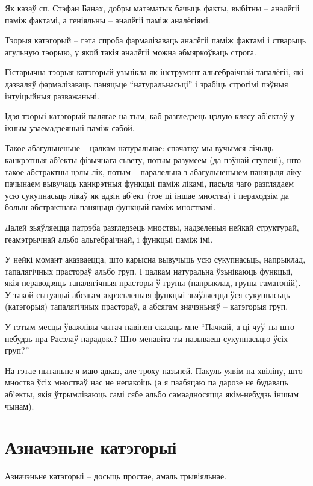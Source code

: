 \documentclass[a4paper,12pt]{book}
\begin{document}
Як казаў сп. Стэфан Банах, добры матэматык бачыць факты, выбітны --
аналёгіі паміж фактамі, а геніяльны -- аналёгіі паміж аналёгіямі.

Тэорыя катэгорый -- гэта спроба фармалізаваць аналёгіі паміж фактамі і
стварыць агульную тэорыю, у якой такія аналёгіі можна абмяркоўваць
строга.

Гістарычна тэорыя катэгорый узьнікла як інструмэнт альгебраічнай
тапалёгіі, які дазваляў фармалізаваць паняцьце ``натуральнасьці'' і
зрабіць строгімі пэўныя інтуіцыйныя разважаньні.

Ідэя тэорыі катэгорый палягае на тым, каб разгледзець цэлую клясу
аб'ектаў у іхным узаемадзеяньні паміж сабой.

Такое абагульненьне -- цалкам натуральнае: спачатку мы вучымся лічыць
канкрэтныя аб'екты фізычнага сьвету, потым разумеем (да пэўнай ступені), што такое
абстрактны цэлы лік, потым -- паралельна з абагульненьнем паняцьця
ліку -- пачынаем вывучаць канкрэтныя функцыі паміж лікамі, пасьля чаго
разглядаем усю сукупнасьць лікаў як адзін аб'ект (тое ці іншае
мноства) і пераходзім да больш абстрактнага паняцьця функцый паміж
мноствамі.

Далей зьяўляецца патрэба разгледзець мноствы, надзеленыя нейкай
структурай, геамэтрычнай альбо альгебраічнай, і функцыі паміж імі.

У нейкі момант аказваецца, што карысна вывучыць усю сукупнасьць,
напрыклад, тапалягічных прастораў альбо груп. І цалкам натуральна
ўзьнікаюць функцыі, якія пераводзяць тапалягічныя прасторы ў групы
(напрыклад, групы гаматопій). У такой сытуацыі абсягам акрэсьленьня
функцыі зьяўляецца ўся сукупнасьць (катэгорыя) тапалягічных прастораў,
а абсягам значэньняў -- катэгорыя груп.

У гэтым месцы ўважлівы чытач павінен сказаць мне ``Пачкай, а ці чуў ты
што-небудзь пра Расэлаў парадокс? Што менавіта ты называеш сукупнасьцю
ўсіх груп?''

На гэтае пытаньне я маю адказ, але троху пазьней. Пакуль уявім на
хвіліну, што мноства ўсіх мностваў нас не непакоіць (а я паабяцаю па
дарозе не будаваць аб'екты, якія ўтрымліваюць самі сябе альбо
самаадносяцца якім-небудзь іншым чынам).

\section{Азначэньне катэгорыі}

Азначэньне катэгорыі -- досыць простае, амаль трывіяльнае.
\end{document}
